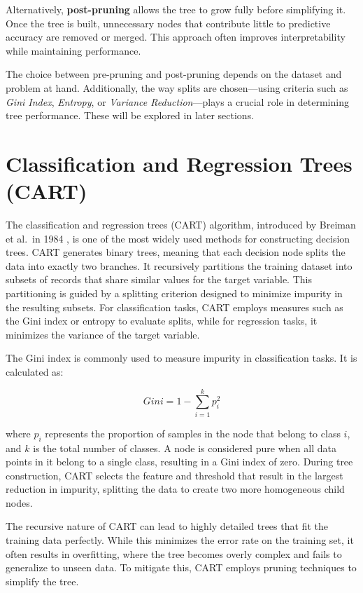 \documentclass[
  11pt,
]{book}
\theoremstyle{definition}
\theoremstyle{definition}
\theoremstyle{definition}
\theoremstyle{definition}
\theoremstyle{remark}
\begin{document}
Alternatively, \textbf{post-pruning} allows the tree to grow fully before simplifying it. Once the tree is built, unnecessary nodes that contribute little to predictive accuracy are removed or merged. This approach often improves interpretability while maintaining performance.

The choice between pre-pruning and post-pruning depends on the dataset and problem at hand. Additionally, the way splits are chosen---using criteria such as \emph{Gini Index}, \emph{Entropy}, or \emph{Variance Reduction}---plays a crucial role in determining tree performance. These will be explored in later sections.

\section{Classification and Regression Trees (CART)}\label{classification-and-regression-trees-cart}

The classification and regression trees (CART) algorithm, introduced by Breiman et al.~in 1984 \citep{breiman1984classification}, is one of the most widely used methods for constructing decision trees. CART generates binary trees, meaning that each decision node splits the data into exactly two branches. It recursively partitions the training dataset into subsets of records that share similar values for the target variable. This partitioning is guided by a splitting criterion designed to minimize impurity in the resulting subsets. For classification tasks, CART employs measures such as the Gini index or entropy to evaluate splits, while for regression tasks, it minimizes the variance of the target variable.

The Gini index is commonly used to measure impurity in classification tasks. It is calculated as:

\[
Gini = 1 - \sum_{i=1}^k p_i^2
\]

where \(p_i\) represents the proportion of samples in the node that belong to class \(i\), and \(k\) is the total number of classes. A node is considered pure when all data points in it belong to a single class, resulting in a Gini index of zero. During tree construction, CART selects the feature and threshold that result in the largest reduction in impurity, splitting the data to create two more homogeneous child nodes.

The recursive nature of CART can lead to highly detailed trees that fit the training data perfectly. While this minimizes the error rate on the training set, it often results in overfitting, where the tree becomes overly complex and fails to generalize to unseen data. To mitigate this, CART employs pruning techniques to simplify the tree.
\end{document}
